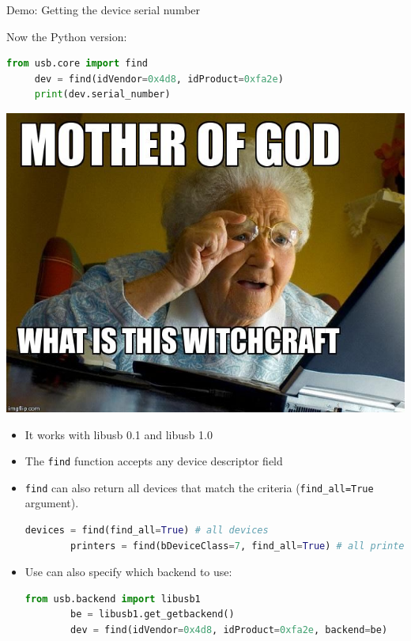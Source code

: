 \documentclass[pdf]{beamer}
\begin{document}
\begin{frame}[fragile]{Demo: Getting the device serial number}
  \begin{minipage}{.55\linewidth}
    \tiny
    \pause
    Now the Python version:
    \pause
    \begin{lstlisting}[language=Python]
     from usb.core import find
     dev = find(idVendor=0x4d8, idProduct=0xfa2e)
     print(dev.serial_number)
    \end{lstlisting}
  \end{minipage}
  \hspace{.05\linewidth}
  \begin{minipage}{.35\linewidth}
    \pause
    \includegraphics[scale=0.15]{img/witchcraft.jpg}
  \end{minipage}

  \begin{itemize}
    \tiny
    \pause
    \item It works with libusb 0.1 and libusb 1.0
    \pause
    \item The \texttt{find} function accepts any device descriptor field
    \pause
    \item \texttt{find} can also return all devices that match the criteria
      (\texttt{find\_all=True} argument).
      \begin{lstlisting}[language=Python]
        devices = find(find_all=True) # all devices
        printers = find(bDeviceClass=7, find_all=True) # all printers
      \end{lstlisting}
    \pause
    \item Use can also specify which backend to use:
      \begin{lstlisting}[language=Python]
        from usb.backend import libusb1
        be = libusb1.get_getbackend()
        dev = find(idVendor=0x4d8, idProduct=0xfa2e, backend=be)
      \end{lstlisting}
  \end{itemize}
\end{frame}
\end{document}
